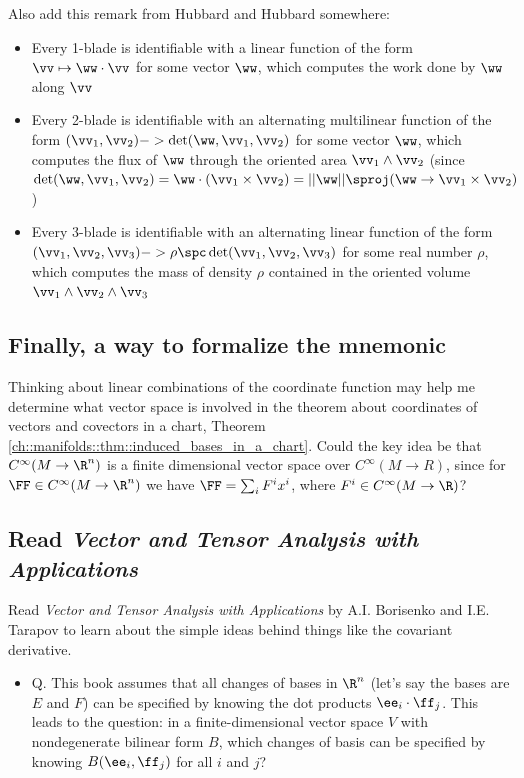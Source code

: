Also add this remark from Hubbard and Hubbard somewhere:

\begin{itemize}
    \item Every 1-blade is identifiable with a linear function of the form $\vv \mapsto \ww \cdot \vv$ for some vector $\ww$, which computes the work done by $\ww$ along $\vv$
    \item Every 2-blade is identifiable with an alternating multilinear function of the form $(\vv_1, \vv_2) -> \det(\ww, \vv_1, \vv_2)$ for some vector $\ww$, which computes the flux of $\ww$ through the oriented area $\vv_1 \wedge \vv_2$ (since $\det(\ww, \vv_1, \vv_2) = \ww \cdot (\vv_1 \times \vv_2) = ||\ww|| \sproj(\ww \rightarrow \vv_1 \times \vv_2)$)
    \item Every 3-blade is identifiable with an alternating linear function of the form $(\vv_1, \vv_2, \vv_3) -> \rho \spc \det(\vv_1, \vv_2, \vv_3)$ for some real number $\rho$, which computes the mass of density $\rho$ contained in the oriented volume $\vv_1 \wedge \vv_2 \wedge \vv_3$
\end{itemize}

\subsection*{Finally, a way to formalize the mnemonic}

Thinking about linear combinations of the coordinate function may help me determine what vector space is involved in the theorem about coordinates of vectors and covectors in a chart, Theorem \ref{ch::manifolds::thm::induced_bases_in_a_chart}. Could the key idea be that
$C^\infty(M \rightarrow \R^n)$ is a finite dimensional vector space over $C^\infty(M \rightarrow R)$, since for $\FF \in C^\infty(M \rightarrow \R^n)$ we have $\FF = \sum_i F^i x^i$, where $F^i \in C^\infty(M \rightarrow \R)$?


\subsection*{Read \textit{Vector and Tensor Analysis with Applications}}

Read \textit{Vector and Tensor Analysis with Applications} by A.I. Borisenko and I.E. Tarapov to learn about the simple ideas behind things like the covariant derivative.

\begin{itemize}
    \item Q. This book assumes that all changes of bases in $\R^n$ (let's say the bases are $E$ and $F$) can be specified by knowing the dot products $\ee_i \cdot \ff_j$. This leads to the question: in a finite-dimensional vector space $V$ with nondegenerate bilinear form $B$, which changes of basis can be specified by knowing $B(\ee_i, \ff_j)$ for all $i$ and $j$?
\end{itemize}

